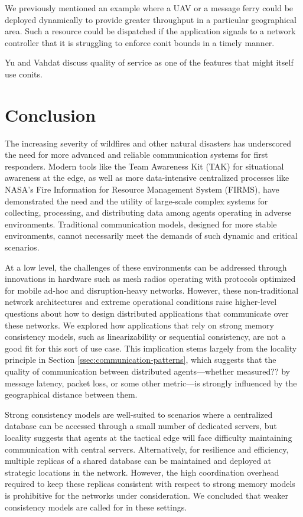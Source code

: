 \documentclass[]             %
{NASA}                       %
\theoremstyle{definition}
\begin{document}
We previously mentioned an example where a UAV or a message ferry
could be deployed dynamically to provide greater throughput in a
particular geographical area. Such a resource could be dispatched if
the application signals to a network controller that it is struggling
to enforce conit bounds in a timely manner.

Yu and Vahdat discuss quality of service as one of the features that
might itself use conits.

\section{Conclusion}
\label{sec:conclusion}
The increasing severity of wildfires and other natural disasters has
underscored the need for more advanced and reliable communication
systems for first responders. Modern tools like the Team Awareness Kit
(TAK) for situational awareness at the edge, as well as more
data-intensive centralized processes like NASA's Fire Information for
Resource Management System (FIRMS), have demonstrated the need and the
utility of large-scale complex systems for collecting, processing, and
distributing data among agents operating in adverse environments.
Traditional communication models, designed for more stable
environments, cannot necessarily meet the demands of such dynamic and
critical scenarios.

At a low level, the challenges of these environments can be addressed
through innovations in hardware such as mesh radios operating with
protocols optimized for mobile ad-hoc and disruption-heavy
networks. However, these non-traditional network architectures and
extreme operational conditions raise higher-level questions about how
to design distributed applications that communicate over these
networks. We explored how applications that rely on strong memory
consistency models, such as linearizability or sequential consistency,
are not a good fit for this sort of use case. This implication
stems largely from the locality principle in Section
\ref{ssec:communication-patterns}, which suggests that the quality of
communication between distributed agents---whether measured?? by message
latency, packet loss, or some other metric---is strongly influenced by
the geographical distance between them.

Strong consistency models are well-suited to scenarios where a
centralized database can be accessed through a small number of
dedicated servers, but locality suggests that agents at the tactical
edge will face difficulty maintaining communication with central
servers. Alternatively, for resilience and efficiency, multiple
replicas of a shared database can be maintained and deployed at
strategic locations in the network. However, the high coordination
overhead required to keep these replicas consistent with respect to
strong memory models is prohibitive for the networks under
consideration. We concluded that weaker consistency models are called
for in these settings.
\end{document}
